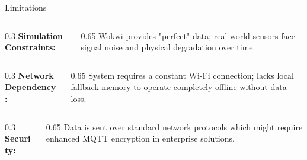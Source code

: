 \documentclass[aspectratio=169]{beamer}
\begin{document}
\begin{frame}{Limitations}
    \begin{columns}[T]
        \begin{column}{0.3\textwidth}
            \textbf{Simulation Constraints:}
        \end{column}
        \begin{column}{0.65\textwidth}
            Wokwi provides "perfect" data; real-world sensors face signal noise and physical degradation over time.
        \end{column}
    \end{columns}
    \vspace{0.5cm}
    \begin{columns}[T]
        \begin{column}{0.3\textwidth}
            \textbf{Network Dependency:}
        \end{column}
        \begin{column}{0.65\textwidth}
            System requires a constant Wi-Fi connection; lacks local fallback memory to operate completely offline without data loss.
        \end{column}
    \end{columns}
    \vspace{0.5cm}
    \begin{columns}[T]
        \begin{column}{0.3\textwidth}
            \textbf{Security:}
        \end{column}
        \begin{column}{0.65\textwidth}
            Data is sent over standard network protocols which might require enhanced MQTT encryption in enterprise solutions.
        \end{column}
    \end{columns}
\end{frame}
\end{document}
